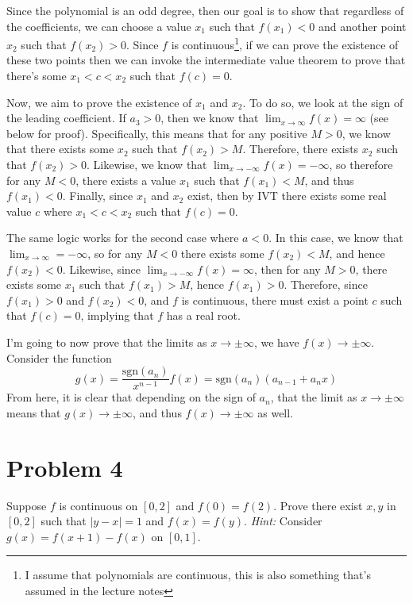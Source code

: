 \documentclass[10pt]{article}
\newcommand{\sgn}{\mathrm{sgn}}
\begin{document}
	\begin{solution}
		Since the polynomial is an odd degree, then our goal is to show that regardless of the coefficients, 
		we can choose a value $x_1$ such that $f(x_1) < 0$ and another point $x_2$ such that $f(x_2) > 0$. Since
		$f$ is continuous\footnote{I assume that polynomials are continuous, this is also something that's 
		assumed in the lecture notes}, if we can prove the existence of these two points then we can invoke the
		intermediate
		value theorem to prove that there's some $x_1 < c < x_2$ such that $f(c) = 0$. 

		Now, we aim to prove the existence of $x_1$ and $x_2$. To do so, we look at the sign of the leading 
		coefficient. If $a_3 > 0$, then we know that $\lim_{x \to \infty} f(x) = \infty$ (see below for proof). Specifically, this 
		means that for any positive $M > 0$, we know that there exists some $x_2$ such that $f(x_2) > M$. 
		Therefore, there exists $x_2$ such that $f(x_2) > 0$. Likewise, we know that $\lim_{x \to -\infty} f(x) =
		-\infty$, so therefore for any $M < 0$, there exists a value $x_1$ such that $f(x_1) < M$, and thus
		$f(x_1) < 0$. Finally, since $x_1$ and $x_2$ exist, then by IVT there exists some real value $c$ where 
		$x_1 < c < x_2$ such that $f(c) = 0$. 

		The same logic works for the second case where $a < 0$. In this case, we know that $\lim_{x \to \infty} =
		-\infty$, so for any $M < 0$ there exists some $f(x_2) < M$, and hence $f(x_2) < 0$. Likewise, since
		$\lim_{x \to -\infty} f(x) = \infty$, then for any $M > 0$, there exists some $x_1$ such that $f(x_1) > M
		$, hence $f(x_1) > 0$. Therefore, since $f(x_1)>0$ and $f(x_2) < 0$, and $f$ is continuous, there must 
		exist a point $c$ such that $f(c) = 0$, implying that $f$ has a real root.

		I'm going to now prove that the limits as $x \to \pm \infty$, we have $f(x) \to \pm \infty$. Consider
		the function 
		\[
		 g(x) = \frac{\sgn(a_n)}{x^{n-1}}f(x) = \sgn(a_n)(a_{n-1} + a_n x)
		\]
		From here, it is clear that
		depending
		on the sign of $a_n$, that the limit as $x \to \pm \infty$ means that $g(x) \to \pm \infty$, and thus 
		$f(x) \to \pm \infty$ as well. 
	\end{solution}

	

	\pagebreak

	\section*{Problem 4}
	Suppose $f$ is continuous on $[0, 2]$ and $f(0) = f(2)$. Prove there exist $x, y$ in $[0, 2]$ such that 
	$|y - x| = 1$ and $f(x) = f(y)$. \textit{Hint:} Consider $g(x) = f(x+1) - f(x)$ on $[0, 1]$. 
\end{document}
